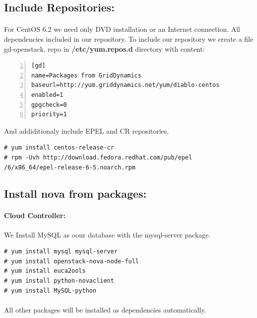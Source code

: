 \newpage
\subsection{Include Repositories:}
\paragraph{}For CentOS 6.2 we need only DVD installation or an Internet connection. All dependencies included in our repository. To include our repository we create a file gd-openstack.
repo in \textbf{/etc/yum.repos.d} directory with content:


\begin{lstlisting}[language={[Latex]TeX}, numbers=left, frame=single]
[gd]
name=Packages from GridDynamics
baseurl=http://yum.griddynamics.net/yum/diablo-centos
enabled=1
gpgcheck=0
priority=1

\end{lstlisting}

And addiditionaly include EPEL and CR repositories.
\begin{lstlisting}[language={[Latex]TeX},basicstyle=\small, frame=single]
# yum install centos-release-cr
# rpm -Uvh http://download.fedora.redhat.com/pub/epel
/6/x86_64/epel-release-6-5.noarch.rpm
\end{lstlisting}

\subsection{Install nova from packages:}
\paragraph{Cloud Controller:}
We Install MySQL as oour database with the mysql-server package.\par

\begin{lstlisting}[language={[Latex]TeX}, frame=single]
# yum install mysql mysql-server
# yum install openstack-nova-node-full
# yum install euca2ools
# yum install python-novaclient
# yum install MySQL-python

\end{lstlisting}

\paragraph{}All other packages will be installed as dependencies automatically.

